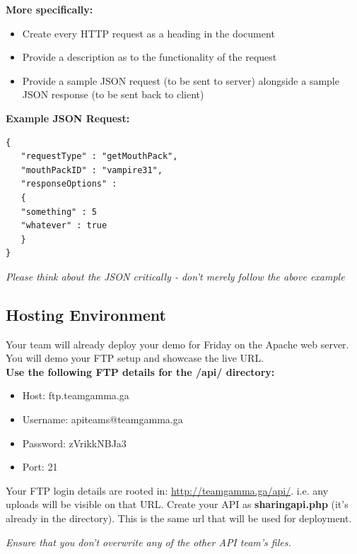 \documentclass{article}
\begin{document}
\textbf{More specifically:}
\begin{itemize}
    \item Create every HTTP request as a heading in the document
    \item Provide a description as to the functionality of the request
    \item Provide a sample JSON request (to be sent to server) alongside a sample JSON response (to be sent back to client)
\end{itemize}

\textbf{Example JSON Request:}
\begin{lstlisting}
{
   "requestType" : "getMouthPack",
   "mouthPackID" : "vampire31",
   "responseOptions" : 
   {
   "something" : 5
   "whatever" : true
   }
}
\end{lstlisting}

\begin{center}
   \textit{Please think about the JSON critically - don't merely follow the above example}
\end{center}

\newpage
\subsection{Hosting Environment}
Your team will already deploy your demo for Friday on the Apache web server. You will demo your FTP setup and showcase the live URL.\\

\textbf{Use the following FTP details for the /api/ directory:} 

\begin{itemize}
\begin{itemize}
\item Host: ftp.teamgamma.ga
\item Username: apiteams@teamgamma.ga
\item Password: zVrikkNBJa3
\item Port: 21
\end{itemize}
\end{itemize}

Your FTP login details are rooted in: \url{http://teamgamma.ga/api/}. i.e. any uploads will be visible on that URL. Create your API as \textbf{sharingapi.php} (it's already in the directory). This is the same url that will be used for deployment.

\begin{center}
   \textit{Ensure that you don't overwrite any of the other API team's files.}
\end{center}
\end{document}
